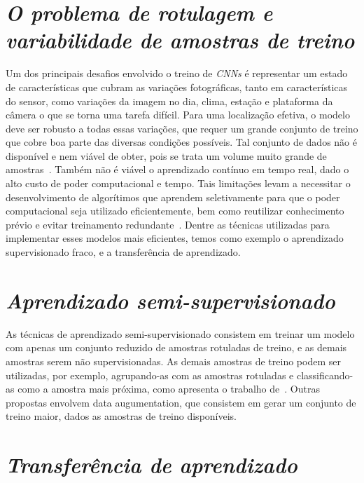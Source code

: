 \section{\textit{O problema de rotulagem e variabilidade de amostras de treino}}\label{sec:Cap2_rotulagem}


Um dos principais desafios envolvido o treino de \textit{CNNs} é representar um estado de características que cubram as variações fotográficas, tanto em características do sensor, como variações da imagem no dia, clima, estação e plataforma da câmera o que se torna uma tarefa difícil. Para uma localização efetiva, o modelo deve ser robusto a todas essas variações, que requer um grande conjunto de treino que cobre boa parte das diversas condições possíveis. Tal conjunto de dados não é disponível e nem viável de obter, pois se trata um volume muito grande de amostras~\cite{rs13194017}. Também não é viável o aprendizado contínuo em tempo real, dado o alto custo de poder computacional e tempo. Tais limitações levam a necessitar o desenvolvimento de algorítimos que aprendem seletivamente para que o poder computacional seja utilizado eficientemente, bem como reutilizar conhecimento prévio e evitar treinamento redundante~\cite{rostami2019learning}.  Dentre as técnicas utilizadas para implementar esses modelos mais eficientes, temos como exemplo o aprendizado supervisionado fraco, e a transferência de aprendizado.

\section{\textit{Aprendizado semi-supervisionado}}\label{sec:Cap2_semisup}

As técnicas de aprendizado semi-supervisionado consistem em treinar um modelo com apenas um conjunto reduzido de amostras rotuladas de treino, e as demais amostras serem não supervisionadas. As demais amostras de treino podem ser utilizadas, por exemplo, agrupando-as com as amostras rotuladas e classificando-as como a amostra mais próxima, como apresenta o trabalho de~\cite{Sanches2003}. Outras propostas envolvem data augumentation, que consistem em gerar um conjunto de treino maior, dados as amostras de treino disponíveis.

\section{\textit{Transferência de aprendizado}}\label{sec:Cap2_transfer}

